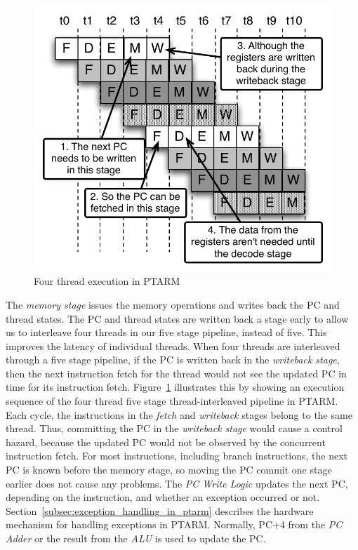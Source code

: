 \begin{figure}
  \vspace{-20pt}
  \begin{center}
    \includegraphics[scale=.65]{figs/four_thread_pipeline}
  \end{center}
  \vspace{-3mm}
  \caption{Four thread execution in PTARM}
  \label{fig:four_thread_pipeline}
  \vspace{-10pt}
\end{figure}      
     
The \emph{memory stage} issues the memory operations and writes back the PC and thread states.
The PC and thread states are written back a stage early to allow us to interleave four threads in our five stage pipeline, instead of five.
This improves the latency of individual threads. 
When four threads are interleaved through a five stage pipeline, if the PC is written back in the \emph{writeback stage}, then the next instruction fetch for the thread would not see the updated PC in time for its instruction fetch. 
Figure~\ref{fig:four_thread_pipeline} illustrates this by showing an execution sequence of the four thread five stage thread-interleaved pipeline in PTARM.
Each cycle, the instructions in the \emph{fetch} and \emph{writeback} stages belong to the same thread.
Thus, committing the PC in the \emph{writeback stage} would cause a control hazard, because the updated PC would not be observed by the concurrent instruction fetch.
For most instructions, including branch instructions, the next PC is known before the memory stage, so moving the PC commit one stage earlier does not cause any problems.  
The \emph{PC Write Logic} updates the next PC, depending on the instruction, and whether an exception occurred or not.
Section~\ref{subsec:exception_handling_in_ptarm} describes the hardware mechanism for handling exceptions in PTARM. 
Normally, PC+4 from the \emph{PC Adder} or the result from the \emph{ALU} is used to update the PC.

